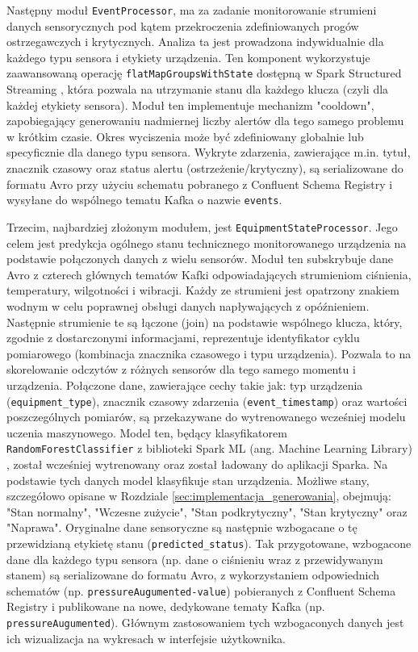 Następny moduł \texttt{EventProcessor}, ma za zadanie monitorowanie strumieni danych sensorycznych pod kątem przekroczenia zdefiniowanych progów ostrzegawczych i krytycznych. Analiza ta jest prowadzona indywidualnie dla każdego typu sensora i etykiety urządzenia. Ten komponent wykorzystuje zaawansowaną operację \texttt{flatMapGroupsWithState} dostępną w Spark Structured Streaming \cite{spark_streaming} , która pozwala na utrzymanie stanu dla każdego klucza (czyli dla każdej etykiety sensora). Moduł ten implementuje mechanizm "cooldown", zapobiegający generowaniu nadmiernej liczby alertów dla tego samego problemu w krótkim czasie. Okres wyciszenia może być zdefiniowany globalnie lub specyficznie dla danego typu sensora. Wykryte zdarzenia, zawierające m.in. tytuł, znacznik czasowy oraz status alertu (ostrzeżenie/krytyczny), są serializowane do formatu Avro przy użyciu schematu pobranego z Confluent Schema Registry \cite{confluent_schema_registry} i wysyłane do wspólnego tematu Kafka o nazwie \texttt{events}.

Trzecim, najbardziej złożonym modułem, jest \texttt{EquipmentStateProcessor}. Jego celem jest predykcja ogólnego stanu technicznego monitorowanego urządzenia na podstawie połączonych danych z wielu sensorów. Moduł ten subskrybuje dane Avro \cite{avro_documentation} z czterech głównych tematów Kafki odpowiadających strumieniom ciśnienia, temperatury, wilgotności i wibracji. Każdy ze strumieni jest opatrzony znakiem wodnym w celu poprawnej obsługi danych napływających z opóźnieniem. Następnie strumienie te są łączone (join) na podstawie wspólnego klucza, który, zgodnie z dostarczonymi informacjami, reprezentuje identyfikator cyklu pomiarowego (kombinacja znacznika czasowego i typu urządzenia). Pozwala to na skorelowanie odczytów z różnych sensorów dla tego samego momentu i urządzenia. Połączone dane, zawierające cechy takie jak: typ urządzenia (\texttt{equipment\_type}), znacznik czasowy zdarzenia (\texttt{event\_timestamp}) oraz wartości poszczególnych pomiarów, są przekazywane do wytrenowanego wcześniej modelu uczenia maszynowego. Model ten, będący klasyfikatorem \texttt{RandomForestClassifier} z biblioteki Spark ML (ang. Machine Learning Library) \cite{spark_mllib_reference}, został wcześniej wytrenowany oraz został ładowany do aplikacji Sparka. Na podstawie tych danych model klasyfikuje stan urządzenia. Możliwe stany, szczegółowo opisane w Rozdziale \ref{sec:implementacja_generowania}, obejmują: "Stan normalny", "Wczesne zużycie", "Stan podkrytyczny", "Stan krytyczny" oraz "Naprawa". Oryginalne dane sensoryczne są następnie wzbogacane o tę przewidzianą etykietę stanu (\texttt{predicted\_status}). Tak przygotowane, wzbogacone dane dla każdego typu sensora (np. dane o ciśnieniu wraz z przewidywanym stanem) są serializowane do formatu Avro, z wykorzystaniem odpowiednich schematów (np. \texttt{pressureAugumented-value}) pobieranych z Confluent Schema Registry \cite{confluent_schema_registry} i publikowane na nowe, dedykowane tematy Kafka (np. \texttt{pressureAugumented}). Głównym zastosowaniem tych wzbogaconych danych jest ich wizualizacja na wykresach w interfejsie użytkownika.

